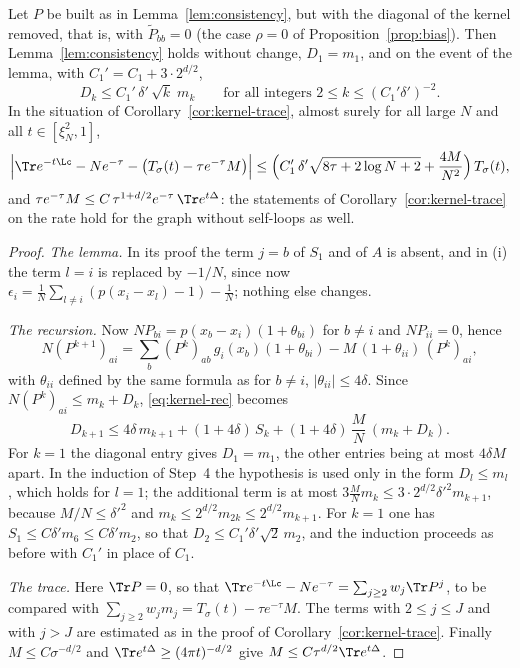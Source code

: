 \begin{corollary}\label{cor:kernel-noloops}
Let $P$ be built as in Lemma~\ref{lem:consistency}, but with the diagonal of the kernel removed, that is, with $\tilde P_{bb}=0$ (the case $\rho=0$ of Proposition~\ref{prop:bias}). Then Lemma~\ref{lem:consistency} holds without change, $D_1=m_1$, and on the event of the lemma, with $C_1'=C_1+3\cdot2^{d/2}$,
\[
D_k\le C_1'\,\delta'\,\sqrt k\;m_k\qquad\text{for all integers }2\le k\le(C_1'\delta')^{-2}.
\]
In the situation of Corollary~\ref{cor:kernel-trace}, almost surely for all large $N$ and all $t\in[\xi_N^2,1]$,
\[
\Big|\Tr e^{-t\Lc}-Ne^{-\tau}-\big(T_\sigma(t)-\tau e^{-\tau}M\big)\Big|\le\Big(C_1'\,\delta'\sqrt{8\tau+2\log N+2}+\frac{4M}{N^2}\Big)\,T_\sigma(t),
\]
and $\tau e^{-\tau}M\le C\,\tau^{1+d/2}e^{-\tau}\,\Tr e^{t\Delta}$: the statements of Corollary~\ref{cor:kernel-trace} on the rate hold for the graph without self-loops as well.
\end{corollary}

\begin{proof}
\emph{The lemma.} In its proof the term $j=b$ of $S_1$ and of $A$ is absent, and in (i) the term $l=i$ is replaced by $-1/N$, since now $\epsilon_i=\frac1N\sum_{l\ne i}(p(x_i-x_l)-1)-\frac1N$; nothing else changes.

\emph{The recursion.} Now $NP_{bi}=p(x_b-x_i)(1+\theta_{bi})$ for $b\ne i$ and $NP_{ii}=0$, hence
\[
N(P^{k+1})_{ai}=\sum_b(P^k)_{ab}\,g_i(x_b)(1+\theta_{bi})-M\,(1+\theta_{ii})\,(P^k)_{ai},
\]
with $\theta_{ii}$ defined by the same formula as for $b\ne i$, $|\theta_{ii}|\le4\delta$. Since $N(P^k)_{ai}\le m_k+D_k$, \eqref{eq:kernel-rec} becomes
\[
D_{k+1}\le4\delta\,m_{k+1}+(1+4\delta)\,S_k+(1+4\delta)\,\frac MN\,(m_k+D_k).
\]
For $k=1$ the diagonal entry gives $D_1=m_1$, the other entries being at most $4\delta M$ apart. In the induction of Step~4 the hypothesis is used only in the form $D_l\le m_l$, which holds for $l=1$; the additional term is at most $3\frac MNm_k\le3\cdot2^{d/2}\delta'^2m_{k+1}$, because $M/N\le\delta'^2$ and $m_k\le2^{d/2}m_{2k}\le2^{d/2}m_{k+1}$. For $k=1$ one has $S_1\le C\delta'm_6\le C\delta'm_2$, so that $D_2\le C_1'\delta'\sqrt2\,m_2$, and the induction proceeds as before with $C_1'$ in place of $C_1$.

\emph{The trace.} Here $\Tr P=0$, so that $\Tr e^{-t\Lc}-Ne^{-\tau}=\sum_{j\ge2}w_j\Tr P^j$, to be compared with $\sum_{j\ge2}w_jm_j=T_\sigma(t)-\tau e^{-\tau}M$. The terms with $2\le j\le J$ and with $j>J$ are estimated as in the proof of Corollary~\ref{cor:kernel-trace}. Finally $M\le C\sigma^{-d/2}$ and $\Tr e^{t\Delta}\ge(4\pi t)^{-d/2}$ give $M\le C\tau^{d/2}\Tr e^{t\Delta}$.
\end{proof}

